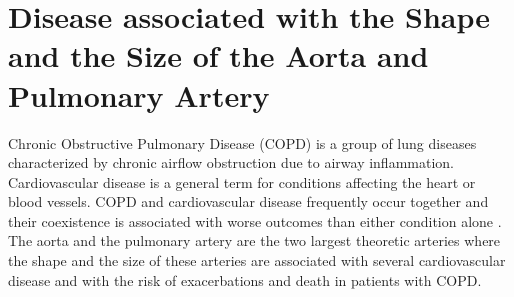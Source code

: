 
\section{Disease associated with the Shape and the Size of the Aorta and Pulmonary Artery} \label{sec:Disease} %
Chronic Obstructive Pulmonary Disease (COPD) is a group of lung diseases characterized by chronic airflow obstruction due to airway inflammation. Cardiovascular disease is a general term for conditions affecting the heart or blood vessels. \gls{COPD} and cardiovascular disease frequently occur together and their coexistence is associated with worse outcomes than either condition alone \autocite{rabe2018cardiovascular}. The aorta and the pulmonary artery are the two largest theoretic arteries where the shape and the size of these arteries are associated with several cardiovascular disease and with the risk of exacerbations and death in patients with \gls{COPD}. 

